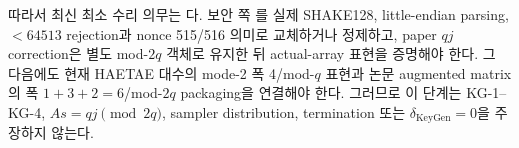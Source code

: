 따라서 최신 최소 수리 의무는
다. 보안 쪽
를 실제 SHAKE128, little-endian parsing,
\(<64513\) rejection과 nonce 515/516 의미로 교체하거나 정제하고, paper \(qj\)
correction은 별도 mod-\(2q\) 객체로 유지한 뒤 actual-array 표현을 증명해야 한다.
그 다음에도 현재 HAETAE 대수의 mode-2 폭 4/mod-\(q\) 표현과 논문 augmented
matrix의 폭 \(1+3+2=6\)/mod-\(2q\) packaging을 연결해야 한다. 그러므로 이
단계는 KG-1--KG-4, \(As=qj\pmod{2q}\), sampler distribution, termination 또는
\(\delta_{\mathrm{KeyGen}}=0\)을 주장하지 않는다.
